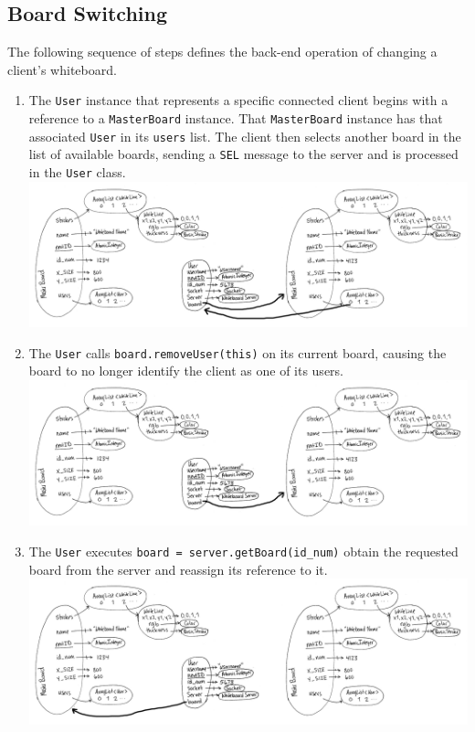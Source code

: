 \newpage
\subsection{Board Switching}
The following sequence of steps defines the back-end operation of changing a client's whiteboard.
\begin{enumerate}
\item The \texttt{User} instance that represents a specific connected client begins with a reference to a \texttt{MasterBoard} instance. That \texttt{MasterBoard} instance has that associated \texttt{User} in its \texttt{users} list. The client then selects another board in the list of available boards, sending a \texttt{SEL} message to the server and is processed in the \texttt{User} class. \\  \includegraphics[keepaspectratio=1,width=6in]{img/switch-sequence/switch-00.jpg}
\item The \texttt{User} calls \texttt{board.removeUser(this)} on its current board, causing the board to no longer identify the client as one of its users. \\ \includegraphics[keepaspectratio=1,width=6in]{img/switch-sequence/switch-01.jpg}
\item The \texttt{User} executes \texttt{board = server.getBoard(id\_num)} obtain the requested board from the server and reassign its reference to it. \\ \includegraphics[keepaspectratio=1,width=6in]{img/switch-sequence/switch-02.jpg}

\end{enumerate}
